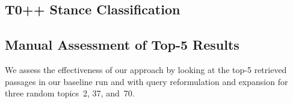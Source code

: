 \subsection{T0++ Stance Classification}


\subsection{Manual Assessment of Top-5 Results}

We assess the effectiveness of our approach by looking at the top-5 retrieved passages in our baseline run and with query reformulation and expansion for three random topics~2, 37, and~70.






